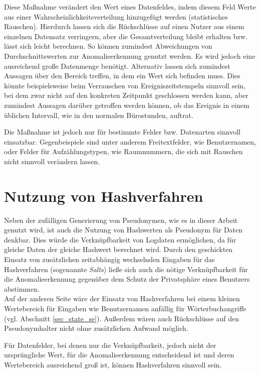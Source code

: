 Diese Maßnahme verändert den Wert eines Datenfeldes, indem diesem Feld Werte aus einer Wahrscheinlichkeitsverteilung hinzugefügt werden (statistisches Rauschen). 
Hierdurch lassen sich die Rückschlüsse auf einen Nutzer aus einem einzelnen Datensatz verringern, aber die Gesamtverteilung bleibt erhalten bzw. lässt sich leicht berechnen. 
So können zumindest Abweichungen von Durchschnittswerten zur Anomalieerkennung genutzt werden. 
Es wird jedoch eine ausreichend große Datenmenge benötigt. Alternativ lassen sich zumindest Aussagen über den Bereich treffen, in dem ein Wert sich befinden muss. Dies könnte beispielsweise beim Verrauschen von Ereigniszeitstempeln sinnvoll sein, bei dem zwar nicht auf den konkreten Zeitpunkt geschlossen werden kann, aber zumindest Aussagen darüber getroffen werden können, ob das Ereignis in einem üblichen Intervall, wie in den normalen Bürostunden, auftrat.

Die Maßnahme ist jedoch nur für bestimmte Felder bzw. Datenarten sinnvoll einsatzbar. Gegenbeispiele sind unter anderem Freitextfelder, wie Benutzernamen, oder Felder für Aufzählungstypen, wie Raumnummern, die sich mit Rauschen nicht sinnvoll verändern lassen. 

\section{Nutzung von Hashverfahren}

Neben der zufälligen Generierung von Pseudonymen, wie es in dieser Arbeit genutzt wird, ist auch die Nutzung von Hashwerten als Pseudonym für Daten denkbar. Dies würde die Verknüpfbarkeit von Logdaten ermöglichen, da für gleiche Daten der gleiche Hashwert berechnet wird. Durch den geschickten Einsatz von zusätzlichen zeitabhängig wechselnden Eingaben für das Hashverfahren (sogenannte \textit{Salts}) ließe sich auch die nötige Verknüpfbarkeit für die Anomalieerkennung gegenüber dem Schutz der Privatsphäre eines Benutzers abstimmen.\\
Auf der anderen Seite wäre der Einsatz von Hashverfahren bei einem kleinen Wertebereich für Eingaben wie Benutzernamen anfällig für Wörterbuchangriffe (vgl. Abschnitt \ref{sec_state_se}). Außerdem wären auch Rückschlüsse auf den Pseudonymhalter nicht ohne zusätzlichen Aufwand möglich.

Für Datenfelder, bei denen nur die Verknüpfbarkeit, jedoch nicht der ursprüngliche Wert, für die Anomalieerkennung entscheidend ist und deren Wertebereich ausreichend groß ist, können Hashverfahren sinnvoll sein. 

